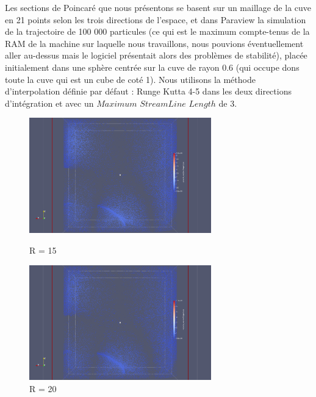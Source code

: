 \documentclass[a4paper,12pt,titlepage]{report}
\begin{document}
\begin{onehalfspace}
Les sections de Poincaré que nous présentons se basent sur un maillage de la cuve en 21 points selon les trois directions de l'espace, et dans Paraview la simulation de la trajectoire de 100 000 particules (ce qui est le maximum compte-tenus de la RAM de la machine sur laquelle nous travaillons, nous pouvions éventuellement aller au-dessus mais le logiciel présentait alors des problèmes de stabilité), placée initialement dans une sphère centrée sur la cuve de rayon 0.6 (qui occupe dons toute la cuve qui est un cube de coté 1). 
Nous utilisons la méthode d'interpolation définie par défaut : Runge Kutta 4-5 dans les deux directions d'intégration et avec un $Maximum$ $StreamLine$ $Length$ de 3. 

\begin{figure}[!h]
    \begin{minipage}[c]{.46\linewidth}
        \centering
        \includegraphics[height = 5cm, keepaspectratio]{graphes/Paraview/section_pioncarre_R_15.png}
        \caption{R = 15}
    \end{minipage}
    \hfill%
    \begin{minipage}[c]{.46\linewidth}
        \centering
        \includegraphics[height = 5cm, keepaspectratio]{graphes/Paraview/section_pioncarre_R_20.png}
        \caption{R = 20}
    \end{minipage}
\end{figure}
\begin{figure}[!h]
    \begin{minipage}[c]{.46\linewidth}
        \centering

\end{minipage}
\end{figure}
\end{onehalfspace}
\end{document}
